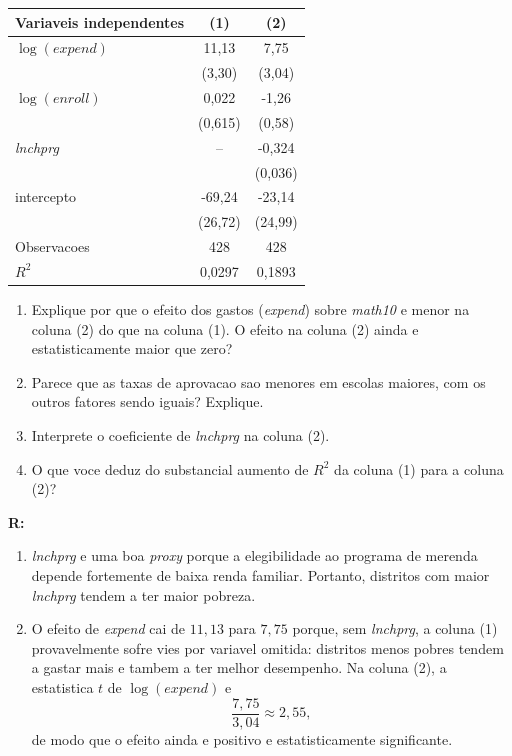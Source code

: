 \documentclass[12pt,letterpaper, onecolumn]{exam}
\renewenvironment{solution}
{\par\noindent\textbf{R:}\enspace\color{blue}}
{\par\color{black}}
\begin{document}
\begin{questions}
\begin{center}
\begin{tabular}{lcc}
\toprule
Variaveis independentes & (1) & (2) \\
\midrule
\(\log(expend)\) & 11,13 & 7,75 \\
& (3,30) & (3,04) \\
\(\log(enroll)\) & 0,022 & -1,26 \\
& (0,615) & (0,58) \\
\textit{lnchprg} & -- & -0,324 \\
& & (0,036) \\
intercepto & -69,24 & -23,14 \\
& (26,72) & (24,99) \\
Observacoes & 428 & 428 \\
\(R^2\) & 0,0297 & 0,1893 \\
\bottomrule
\end{tabular}
\end{center}

\begin{enumerate}[label=(\roman*),resume]
    \item Explique por que o efeito dos gastos (\textit{expend}) sobre \textit{math10} e menor na coluna (2) do que na coluna (1). O efeito na coluna (2) ainda e estatisticamente maior que zero?
    \item Parece que as taxas de aprovacao sao menores em escolas maiores, com os outros fatores sendo iguais? Explique.
    \item Interprete o coeficiente de \textit{lnchprg} na coluna (2).
    \item O que voce deduz do substancial aumento de \(R^2\) da coluna (1) para a coluna (2)?
\end{enumerate}

\begin{solution}
\begin{enumerate}[label=(\roman*)]
    \item \textit{lnchprg} e uma boa \textit{proxy} porque a elegibilidade ao programa de merenda depende fortemente de baixa renda familiar. Portanto, distritos com maior \textit{lnchprg} tendem a ter maior pobreza.

    \item O efeito de \textit{expend} cai de \(11,13\) para \(7,75\) porque, sem \textit{lnchprg}, a coluna (1) provavelmente sofre vies por variavel omitida: distritos menos pobres tendem a gastar mais e tambem a ter melhor desempenho. Na coluna (2), a estatistica \(t\) de \(\log(expend)\) e
    \[
    \frac{7,75}{3,04}\approx 2,55,
    \]
    de modo que o efeito ainda e positivo e estatisticamente significante.


\end{enumerate}
\end{solution}
\end{questions}
\end{document}
